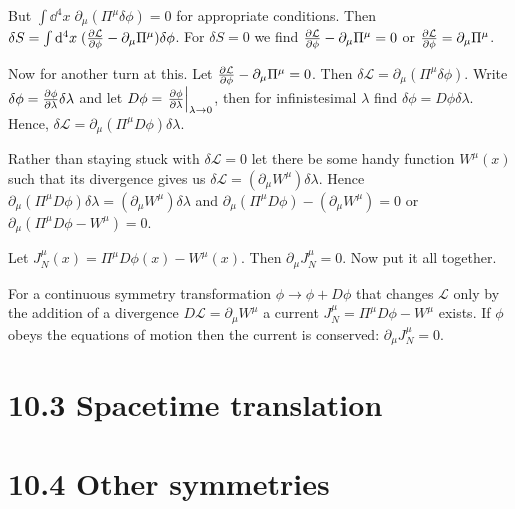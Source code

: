 \documentclass{article}
\begin{document}
But $\int \dd^4 x\; \partial_\mu(\Pi^\mu \delta\phi)=0$ for appropriate conditions.  Then $\delta S=\int \dd^4 x\; (\pdv{\mathcal{L}}{\phi}-\partial_\mu \Pi^\mu)\delta\phi$. For $\delta S=0$ we find $\pdv{\mathcal{L}}{\phi}-\partial_\mu \Pi^\mu=0$ or $\pdv{\mathcal{L}}{\phi}=\partial_\mu \Pi^\mu$.



Now for another turn at this. Let $\pdv{\mathcal{L}}{\phi}-\partial_\mu \Pi^\mu=0$. Then $\delta\mathcal{L}=\partial_\mu(\Pi^\mu \delta\phi)$. Write $\delta \phi=\pdv{\phi}{\lambda}\delta\lambda$ and let $D\phi=\eval{\pdv{\phi}{\lambda}}_{\lambda\to 0}$, then for infinistesimal $\lambda$ find $\delta \phi=D\phi\delta\lambda$. Hence, $\delta\mathcal{L}=\partial_\mu(\Pi^\mu D \phi)\delta\lambda$.

Rather than staying stuck with $\delta\mathcal{L}=0$ let there be some handy function $W^\mu (x)$ such that its divergence gives us $\delta\mathcal{L}=(\partial_\mu W^\mu) \delta\lambda$. Hence $\partial_\mu(\Pi^\mu D \phi)\delta\lambda=(\partial_\mu W^\mu) \delta\lambda$ and $\partial_\mu(\Pi^\mu D \phi)-(\partial_\mu W^\mu)=0$ or $\partial_\mu(\Pi^\mu D \phi- W^\mu)=0$.

Let $J_N^\mu (x)=\Pi^\mu D \phi(x)- W^\mu (x)$. Then $\partial_\mu J_N^\mu=0$. Now put it all together.

For a continuous symmetry transformation $\phi\to \phi+D\phi$ that changes $\mathcal{L}$ only by the addition of a divergence $D\mathcal{L}=\partial_\mu W^\mu$ a current $J_N^\mu =\Pi^\mu D \phi- W^\mu $ exists. If $\phi$ obeys the equations of motion then the current is conserved: $\partial_\mu J_N^\mu=0$.





\section*{10.3 Spacetime translation}

\section*{10.4 Other symmetries}
\end{document}

